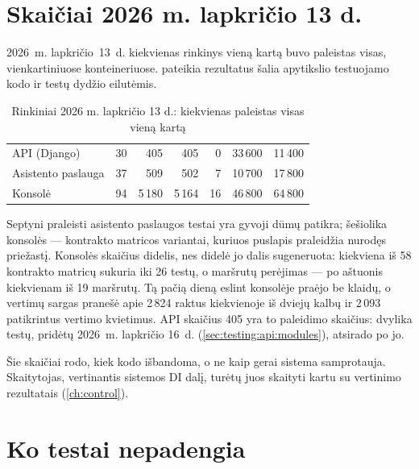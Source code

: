 \section{Skaičiai 2026 m. lapkričio 13 d.}\label{sec:testing:numbers}

2026~m. lapkričio~13~d. kiekvienas rinkinys vieną kartą buvo paleistas visas, vienkartiniuose
konteineriuose.  pateikia rezultatus šalia apytikslio testuojamo kodo
ir testų dydžio eilutėmis.

\begin{table}[H]
\caption{Rinkiniai 2026 m. lapkričio 13 d.: kiekvienas paleistas visas vieną kartą}\label{tab:testing:numbers}
\begin{tabularx}{\textwidth}{@{}Yrrrrrr@{}}
\toprule
{} &  &  &  &  &  &  \\
\midrule
API (Django) & 30 & 405 & 405 & 0 & 33\,600 & 11\,400 \\
Asistento paslauga & 37 & 509 & 502 & 7 & 10\,700 & 17\,800 \\
Konsolė & 94 & 5\,180 & 5\,164 & 16 & 46\,800 & 64\,800 \\
\bottomrule
\end{tabularx}
\end{table}

Septyni praleisti asistento paslaugos testai yra gyvoji dūmų patikra; šešiolika konsolės ---
kontrakto matricos variantai, kuriuos puslapis praleidžia nurodęs priežastį. Konsolės skaičius
didelis, nes didelė jo dalis sugeneruota: kiekviena iš 58 kontrakto matricų sukuria iki 26
testų, o maršrutų perėjimas --- po aštuonis kiekvienam iš 19 maršrutų. Tą pačią dieną eslint
konsolėje praėjo be klaidų, o vertimų sargas pranešė apie 2\,824 raktus kiekvienoje iš dviejų
kalbų ir 2\,093 patikrintus vertimo kvietimus. API skaičius 405 yra to paleidimo skaičius:
dvylika testų, pridėtų 2026~m. lapkričio 16~d. (\cref{sec:testing:api:modules}), atsirado po jo.

Šie skaičiai rodo, kiek kodo išbandoma, o ne kaip gerai sistema samprotauja. Skaitytojas,
vertinantis sistemos DI dalį, turėtų juos skaityti kartu su vertinimo rezultatais
(\cref{ch:control}).


\section{Ko testai nepadengia}\label{sec:testing:gaps}

